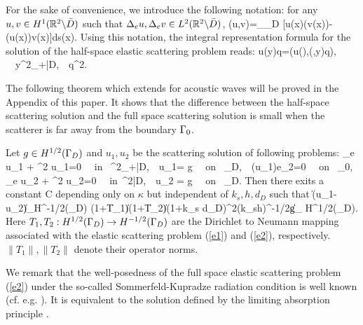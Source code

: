 For the sake of convenience, we introduce the following notation: for any $u,v\in H^1(\mathbb{R}^2\backslash\bar D)$ such that $\Delta_e u, \Delta_e v\in L^2(\mathbb{R}^2\backslash\bar D)$,
\be\label{g1}
\GG(u,v)=\int_{\Ga_D} [u(x)\cdot \sigma(v(x))\nu- \sigma(u(x))\nu\cdot v(x)]ds(x).
\ee
Using this notation, the integral representation formula for the solution of the half-space elastic scattering problem reads: 
\be\label{g2}
u(y)\cdot q=\GG(u(\cdot),\N(\cdot,y)q), \ \ \forall y\in\R^2_+\bks\bar D,\ \ \forall q\in\R^2.
\ee





The following theorem which extends \cite[Theorem 4.1]{RTMhalf_aco} for acoustic waves will be proved in the Appendix of this paper. It shows that the difference between the half-space scattering solution and the full space scattering solution is small when the scatterer is far away from the boundary $\Gamma_0$.

\begin{thm}\label{thm:4.2}
	Let $g\in H^{1/2}(\Gamma_D)$ and $u_1,u_2$ be the scattering solution of following problems:
	\be\label{e1}
	\Delta_e u_1 + \omega^2 u_1=0 \ \ \mbox{\rm in } \R^2_+\bks \bar{D},\ \  u_1= g \ \ \mbox{\rm on } \Ga_D,\ \ \sigma(u_1)e_2=0 \ \ \mbox{\rm on } \Ga_0,\\
	\label{e2}
	\Delta_e u_2 + \omega^2 u_2=0 \ \ \mbox{\rm in }\R^2\bks \bar{D},\ \ u_2 = g \ \ \mbox{\rm on } \Ga_D.
	\ee
	Then there exits a constant C depending only on $\kappa$ but independent of $k_s, h,d_D$ such that
	\ben\hskip-2cm
	\|\sigma(u_1-u_2)\nu\|_{H^{-1/2}(\Gamma_D)}
	\le{}(1+\|T_1\|)(1+\|T_2\|)(1+k_s d_D)^2(k_sh)^{-1/2}\|g\|_{ H^{1/2}(\Ga_D)}.
	\een
	Here $T_1, T_2:H^{1/2}(\Gamma_D)\to H^{-1/2}(\Gamma_D)$ are the Dirichlet to Neumann mapping associated with the elastic scattering problem (\ref{e1}) and (\ref{e2}), respectively. $\|T_1\|, \|T_2\|$ denote their operator norms.
\end{thm}

We remark that the well-posedness of the full space elastic scattering problem (\ref{e2}) under the so-called Sommerfeld-Kupradze radiation condition is well known (cf. e.g. \cite{ku63}). It is equivalent to the solution defined by the limiting absorption principle \cite{leis, cxz2016}.